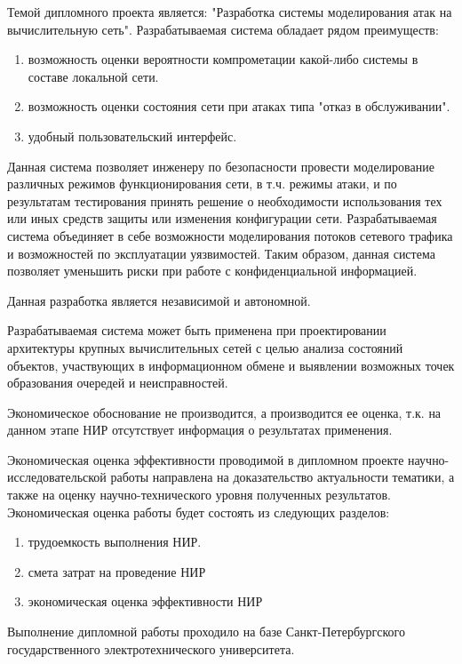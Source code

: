 Темой дипломного проекта является: "Разработка системы моделирования атак на вычислительную сеть". Разрабатываемая система обладает рядом преимуществ:
\begin{enumerate}
\item возможность оценки вероятности компрометации какой-либо системы в составе локальной сети.
\item возможность оценки состояния сети при атаках типа "отказ в обслуживании".
\item удобный пользовательский интерфейс.
\end{enumerate}

Данная система позволяет инженеру по безопасности провести моделирование различных режимов функционирования сети, в т.ч.  режимы атаки, и по результатам тестирования принять решение о необходимости использования тех или иных средств защиты или изменения конфигурации сети. Разрабатываемая система объединяет в себе возможности моделирования потоков сетевого трафика и возможностей по эксплуатации уязвимостей. Таким образом, данная система позволяет уменьшить риски при работе с конфиденциальной информацией.

Данная разработка является независимой и автономной.

Разрабатываемая система может быть применена при проектировании архитектуры крупных вычислительных сетей с целью анализа состояний объектов, участвующих в информационном обмене и выявлении возможных точек образования очередей и неисправностей.

Экономическое обоснование не производится, а производится ее оценка, т.к. на данном этапе НИР отсутствует информация о результатах применения.

Экономическая оценка эффективности проводимой в дипломном проекте научно-исследовательской работы направлена на доказательство актуальности тематики, а также на оценку научно-технического уровня полученных результатов. Экономическая оценка работы будет состоять из следующих разделов:

\begin{enumerate}
\item трудоемкость выполнения НИР.
\item смета затрат на проведение НИР
\item экономическая оценка эффективности НИР
\end{enumerate}

Выполнение дипломной работы проходило на базе Санкт-Петербургского государственного электротехнического университета. 

